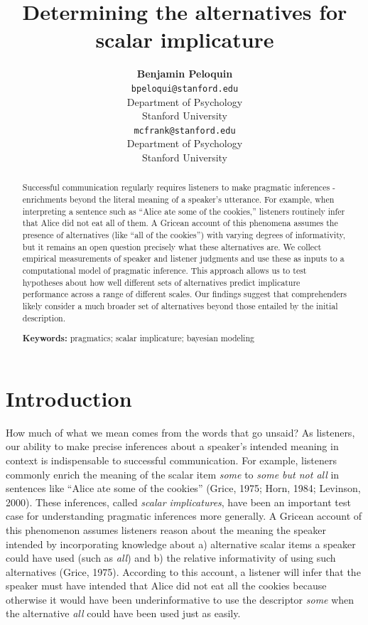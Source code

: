 \documentclass[10pt, letterpaper]{article}
\title{Determining the alternatives for scalar implicature}
\author{{\large \bf Benjamin Peloquin} \\ \texttt{bpeloqui@stanford.edu} \\ Department of Psychology \\ Stanford University \And {\large \bf Michael C. Frank} \\ \texttt{mcfrank@stanford.edu} \\ Department of Psychology \\ Stanford University}
\begin{document}
\maketitle

\begin{abstract}
Successful communication regularly requires listeners to make pragmatic
inferences - enrichments beyond the literal meaning of a speaker's
utterance. For example, when interpreting a sentence such as ``Alice ate
some of the cookies,'' listeners routinely infer that Alice did not eat
all of them. A Gricean account of this phenomena assumes the presence of
alternatives (like ``all of the cookies'') with varying degrees of
informativity, but it remains an open question precisely what these
alternatives are. We collect empirical measurements of speaker and
listener judgments and use these as inputs to a computational model of
pragmatic inference. This approach allows us to test hypotheses about
how well different sets of alternatives predict implicature performance
across a range of different scales. Our findings suggest that
comprehenders likely consider a much broader set of alternatives beyond
those entailed by the initial description.

\textbf{Keywords:}
pragmatics; scalar implicature; bayesian modeling
\end{abstract}

\section{Introduction}\label{introduction}

How much of what we mean comes from the words that go unsaid? As
listeners, our ability to make precise inferences about a speaker's
intended meaning in context is indispensable to successful
communication. For example, listeners commonly enrich the meaning of the
scalar item \emph{some} to \emph{some but not all} in sentences like
``Alice ate some of the cookies'' (Grice, 1975; Horn, 1984; Levinson,
2000). These inferences, called \emph{scalar implicatures}, have been an
important test case for understanding pragmatic inferences more
generally. A Gricean account of this phenomenon assumes listeners reason
about the meaning the speaker intended by incorporating knowledge about
a) alternative scalar items a speaker could have used (such as
\emph{all}) and b) the relative informativity of using such alternatives
(Grice, 1975). According to this account, a listener will infer that the
speaker must have intended that Alice did not eat all the cookies
because otherwise it would have been underinformative to use the
descriptor \emph{some} when the alternative \emph{all} could have been
used just as easily.
\end{document}
